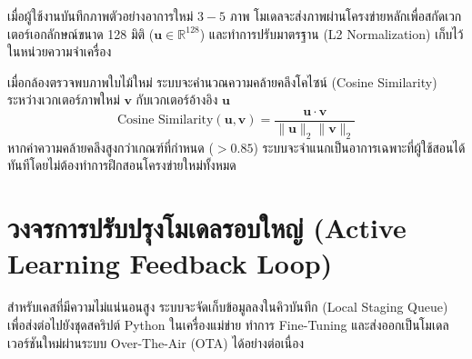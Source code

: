 เมื่อผู้ใช้งานบันทึกภาพตัวอย่างอาการใหม่ $3 - 5$ ภาพ โมเดลจะส่งภาพผ่านโครงข่ายหลักเพื่อสกัดเวกเตอร์เอกลักษณ์ขนาด 128 มิติ ($\mathbf{u} \in \mathbb{R}^{128}$) และทำการปรับมาตรฐาน (L2 Normalization) เก็บไว้ในหน่วยความจำเครื่อง

เมื่อกล้องตรวจพบภาพใบไม้ใหม่ ระบบจะคำนวณความคล้ายคลึงโคไซน์ (Cosine Similarity) ระหว่างเวกเตอร์ภาพใหม่ $\mathbf{v}$ กับเวกเตอร์อ้างอิง $\mathbf{u}$
\begin{equation}
  \text{Cosine Similarity}(\mathbf{u}, \mathbf{v}) = \frac{\mathbf{u} \cdot \mathbf{v}}{\|\mathbf{u}\|_2 \|\mathbf{v}\|_2}
\end{equation}
หากค่าความคล้ายคลึงสูงกว่าเกณฑ์ที่กำหนด ($>0.85$) ระบบจะจำแนกเป็นอาการเฉพาะที่ผู้ใช้สอนได้ทันทีโดยไม่ต้องทำการฝึกสอนโครงข่ายใหม่ทั้งหมด

\section{วงจรการปรับปรุงโมเดลรอบใหญ่ (Active Learning Feedback Loop)}
สำหรับเคสที่มีความไม่แน่นอนสูง ระบบจะจัดเก็บข้อมูลลงในคิวบันทึก (Local Staging Queue) เพื่อส่งต่อไปยังชุดสคริปต์ Python ในเครื่องแม่ข่าย ทำการ Fine-Tuning และส่งออกเป็นโมเดลเวอร์ชันใหม่ผ่านระบบ Over-The-Air (OTA) ได้อย่างต่อเนื่อง
